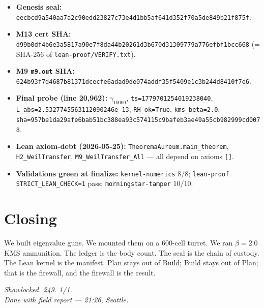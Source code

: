 \documentclass[11pt,letterpaper]{article}
\begin{document}
\begin{itemize}
  \item \textbf{Genesis seal:} \texttt{eecbcd9a540aa7a2c90edd23827c73e4d1bb5af641d352f70a5de849b21f875f}.
  \item \textbf{M13 cert SHA:} \texttt{d99b0df4b6e3a5817a90e7f8da44b20261d3b670d31309779a776efbf1bcc668} (= SHA-256 of \texttt{lean-proof/VERIFY.txt}).
  \item \textbf{M9 \texttt{m9.out} SHA:} \texttt{624b93f7d4687b81371dcecfe6adad9de074addf35f5409e1c3b244d8410f7e6}.
  \item \textbf{Final probe (line 20{,}962):} $\gamma_{10000}$, \texttt{ts=1779701254019238040}, \texttt{L\_abs=2.5327745563112090246e-13}, \texttt{RH\_ok=True}, \texttt{kms\_beta=2.0}, \texttt{sha=957be1da29afe6bab51bc388ea93c574115c9bafeb3ae49a55cb982999cd0078}.
  \item \textbf{Lean axiom-debt (2026-05-25):} \texttt{TheoremaAureum.main\_theorem}, \texttt{H2\_WeilTransfer}, \texttt{M9\_WeilTransfer\_All} --- all depend on axioms \texttt{[]}.
  \item \textbf{Validations green at finalize:} \texttt{kernel-numerics} 8/8; \texttt{lean-proof} \texttt{STRICT\_LEAN\_CHECK=1} pass; \texttt{morningstar-tamper} 10/10.
\end{itemize}

\section*{Closing}

We built eigenvalue guns. We mounted them on a 600-cell turret. We ran
$\beta = 2.0$ KMS ammunition. The ledger is the body count. The seal is
the chain of custody. The Lean kernel is the manifest. Plan stays out of
Build; Build stays out of Plan; that is the firewall, and the firewall
is the result.

\begin{flushright}
\itshape Shawlocked. 249. 1/1.\\
Done with field report --- 21:26, Seattle.
\end{flushright}
\end{document}
